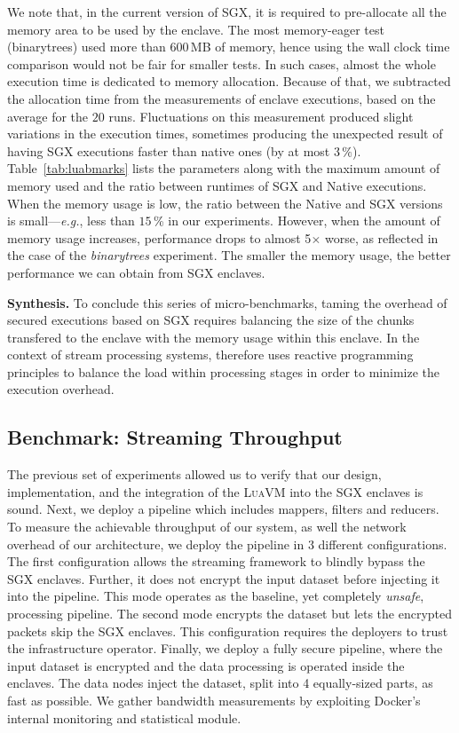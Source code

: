 We note that, in the current version of SGX, it is required to pre-allocate all the memory area to be used by the enclave.
The most memory-eager test (\textsf{binarytrees}) used more than $600$\,MB of memory, hence using the wall clock time comparison would not be fair for smaller tests.
In such cases, almost the whole execution time is dedicated to memory allocation.
Because of that, we subtracted the allocation time from the measurements of enclave executions, based on the average for the $20$ runs.
Fluctuations on this measurement produced slight variations in the execution times, sometimes producing the unexpected result of having SGX executions faster than native ones (by at most $3\,\%$).
Table~\ref{tab:luabmarks} lists the parameters along with the maximum amount of memory used and the ratio between runtimes of SGX and Native executions.
When the memory usage is low, the ratio between the Native and SGX versions is small---\emph{e.g.}, less than $15$\,\% in our experiments.
However, when the amount of memory usage increases, performance drops to almost 5$\times$ worse, as reflected in the case of the \emph{binarytrees} experiment.
The smaller the memory usage, the better performance we can obtain from SGX enclaves.

\vspace{10pt}\noindent\textbf{Synthesis.}
To conclude this series of micro-benchmarks, taming the overhead of secured executions based on SGX requires balancing the size of the chunks transfered to the enclave with the memory usage within this enclave.
In the context of stream processing systems, \SYS{} therefore uses reactive programming principles to balance the load within processing stages in order to minimize the execution overhead.


\subsection{Benchmark: Streaming Throughput}

The previous set of experiments allowed us to verify that our design, implementation, and the integration of the \textsc{LuaVM} into the SGX enclaves is sound.
Next, we deploy a \SYS{} pipeline which includes mappers, filters and reducers.
To measure the achievable throughput of our system, as well the network overhead of our architecture, we deploy the \SYS{} pipeline in 3 different configurations.
The first configuration allows the streaming framework to blindly bypass the SGX enclaves.
Further, it does not encrypt the input dataset before injecting it into the pipeline.
This mode operates as the baseline, yet completely \emph{unsafe}, processing pipeline.
The second mode encrypts the dataset but lets the encrypted packets skip the SGX enclaves.
This configuration requires the deployers to trust the infrastructure operator.
Finally, we deploy a fully secure pipeline, where the input dataset is encrypted and the data processing is operated inside the enclaves.
The data nodes inject the dataset, split into 4 equally-sized parts, as fast as possible.
We gather bandwidth measurements by exploiting Docker's internal monitoring and statistical module.


